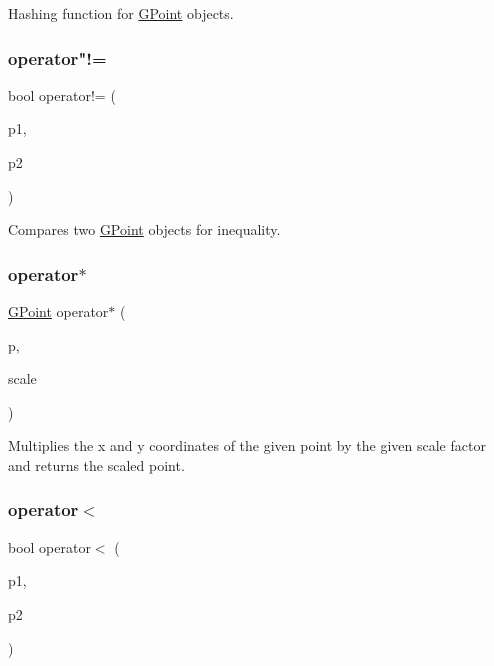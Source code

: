 Hashing function for \mbox{\hyperlink{classGPoint}{G\+Point}} objects. 

\mbox{\label{classGPoint_add41464e7e2d69b7a90c72b16a7dbc6c}} 
\subsubsection{\texorpdfstring{operator"!=}{operator!=}}
{\footnotesize\ttfamily bool operator!= (\begin{DoxyParamCaption}\item[{const \mbox{\hyperlink{classGPoint}{G\+Point}} \&}]{p1,  }\item[{const \mbox{\hyperlink{classGPoint}{G\+Point}} \&}]{p2 }\end{DoxyParamCaption})\hspace{0.3cm}{\ttfamily [friend]}}



Compares two \mbox{\hyperlink{classGPoint}{G\+Point}} objects for inequality. 

\mbox{\label{classGPoint_a8646a3383f5abfedad724d1e5e6040ef}} 
\subsubsection{\texorpdfstring{operator$\ast$}{operator*}}
{\footnotesize\ttfamily \mbox{\hyperlink{classGPoint}{G\+Point}} operator$\ast$ (\begin{DoxyParamCaption}\item[{const \mbox{\hyperlink{classGPoint}{G\+Point}} \&}]{p,  }\item[{double}]{scale }\end{DoxyParamCaption})\hspace{0.3cm}{\ttfamily [friend]}}



Multiplies the x and y coordinates of the given point by the given scale factor and returns the scaled point. 

\mbox{\label{classGPoint_a8ef7ca0053558918c5f7bcae257c1bec}} 
\subsubsection{\texorpdfstring{operator$<$}{operator<}}
{\footnotesize\ttfamily bool operator$<$ (\begin{DoxyParamCaption}\item[{const \mbox{\hyperlink{classGPoint}{G\+Point}} \&}]{p1,  }\item[{const \mbox{\hyperlink{classGPoint}{G\+Point}} \&}]{p2 }\end{DoxyParamCaption})\hspace{0.3cm}{\ttfamily [friend]}}



